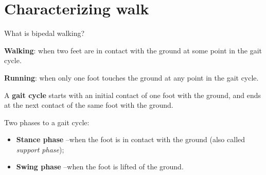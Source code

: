 \documentclass[compress]{beamer}
\begin{document}


\section{Characterizing walk}

\begin{frame}{What is bipedal walking?}

    \textbf{Walking}: when two feet are in contact with the ground at some point in the gait
    cycle.

    \textbf{Running}: when only one foot touches the ground at any point in the
    gait cycle.

    A \textbf{gait cycle} starts with an initial contact of one foot with the
    ground, and ends at the next contact of the same foot with the ground.

    Two phases to a gait cycle:

    \begin{itemize}

        \item \textbf{Stance phase} --when the foot is in contact with the ground
            (also called \emph{support phase});
        \item \textbf{Swing phase} --when the foot is lifted of the ground.
    \end{itemize}

\end{frame}
\end{document}
